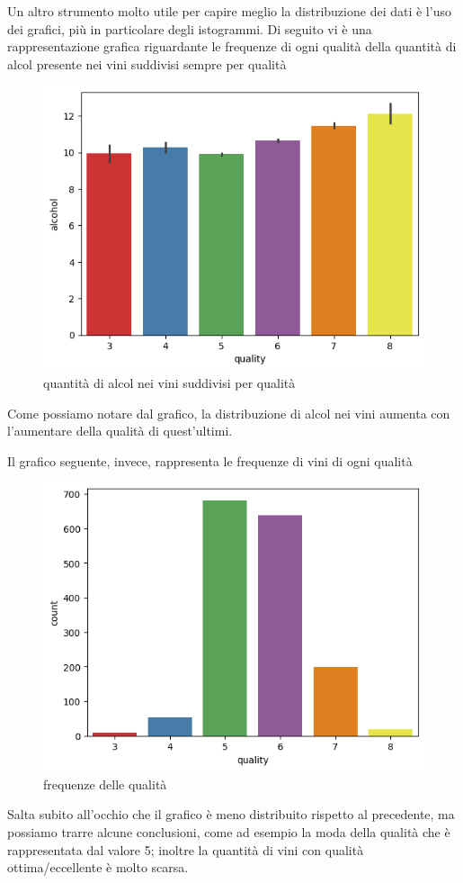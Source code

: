 \documentclass{article}
\begin{document}
\begin{titlepage}
        \newpage
        Un altro strumento molto utile per capire meglio la distribuzione dei dati è l'uso dei grafici, più in particolare degli istogrammi. Di seguito vi è una rappresentazione grafica riguardante le frequenze di ogni qualità della quantità di alcol presente nei vini suddivisi sempre per qualità

        \begin{figure}[ht]
            \centering
            \includegraphics[width=0.5\linewidth]{barPlot-alcohol.png}
            \caption{ quantità di alcol nei vini suddivisi per qualità}
            \label{fig:enter-label}
        \end{figure}

        Come possiamo notare dal grafico, la distribuzione di alcol nei vini aumenta con l'aumentare della qualità di quest'ultimi.
        
        Il grafico seguente, invece, rappresenta le frequenze di vini di ogni qualità
        
        \begin{figure}[ht]
            \centering
            \includegraphics[width=0.5\linewidth]{countPlot-quality.png}
            \caption{ frequenze delle qualità}
            \label{fig:enter-label}
        \end{figure}

        Salta subito all'occhio che il grafico è meno distribuito rispetto al precedente, ma possiamo trarre alcune conclusioni, come ad esempio la moda della qualità che è rappresentata dal valore 5; inoltre la quantità di vini con qualità ottima/eccellente è molto scarsa.


\end{titlepage}
\end{document}
